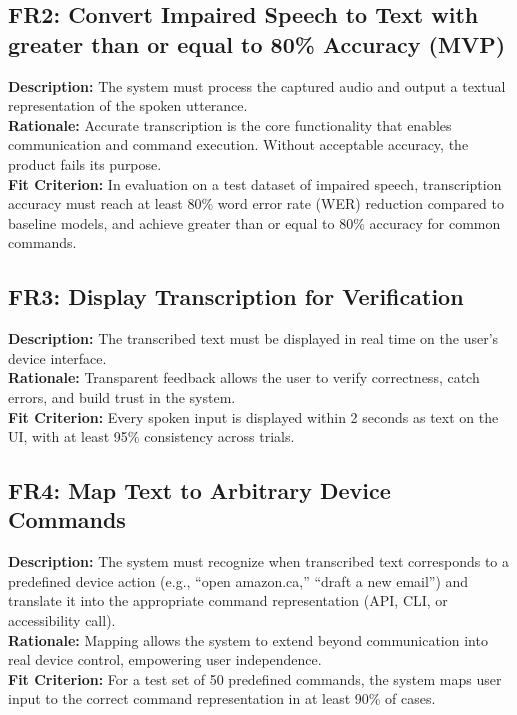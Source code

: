 \documentclass[11pt]{article}
\begin{document}
\bigskip
\subsection{FR2: Convert Impaired Speech to Text with greater than or equal to 80\% Accuracy (MVP)}
\textbf{Description:} The system must process the captured audio and output a textual representation of the spoken utterance.\\
\textbf{Rationale:} Accurate transcription is the core functionality that enables communication and command execution. Without acceptable accuracy, the product fails its purpose.\\
\textbf{Fit Criterion:} In evaluation on a test dataset of impaired speech, transcription accuracy must reach at least 80\% word error rate (WER) reduction compared to baseline models, and achieve greater than or equal to 80\% accuracy for common commands.

\bigskip
\subsection{FR3: Display Transcription for Verification}
\textbf{Description:} The transcribed text must be displayed in real time on the user’s device interface.\\
\textbf{Rationale:} Transparent feedback allows the user to verify correctness, catch errors, and build trust in the system.\\
\textbf{Fit Criterion:} Every spoken input is displayed within 2 seconds as text on the UI, with at least 95\% consistency across trials.

\bigskip
\subsection{FR4: Map Text to Arbitrary Device Commands}
\textbf{Description:} The system must recognize when transcribed text corresponds to a predefined device action (e.g., “open amazon.ca,” “draft a new email”) and translate it into the appropriate command representation (API, CLI, or accessibility call).\\
\textbf{Rationale:} Mapping allows the system to extend beyond communication into real device control, empowering user independence.\\
\textbf{Fit Criterion:} For a test set of 50 predefined commands, the system maps user input to the correct command representation in at least 90\% of cases.

\bigskip
\end{document}
